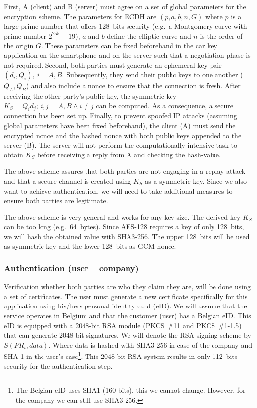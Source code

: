First, A (client) and B (server) must agree on a set of global parameters for the encryption scheme. The parameters for ECDH are $(p, a, b, n, G)$ where $p$ is a large prime number that offers 128~bits security (e.g.\ a Montgomery curve with prime number $2^{255}-19$), $a$ and $b$ define the elliptic curve and $n$ is the order of the origin $G$. These parameters can be fixed beforehand in the car key application on the smartphone and on the server such that a negotiation phase is not required. Second, both parties must generate an ephemeral key pair $(d_i,Q_i),\ i=A,B$. Subsequently, they send their public keys to one another ($Q_A, Q_B$) and also include a nonce to ensure that the connection is fresh. After receiving the other party's public key, the symmetric key $K_S=Q_id_j;\ i,j=A,B \land i\ne j$ can be computed. As a consequence, a secure connection has been set up. Finally, to prevent spoofed IP attacks (assuming global parameters have been fixed beforehand), the client (A) must send the encrypted nonce and the hashed nonce with both public keys appended to the server (B). The server will not perform the computationally intensive task to obtain $K_S$ before receiving a reply from A and checking the hash-value.

The above scheme assures that both parties are not engaging in a replay attack and that a secure channel is created using $K_S$ as a symmetric key. Since we also want to achieve authentication, we will need to take additional measures to ensure both parties are legitimate.

The above scheme is very general and works for any key size. The derived key $K_S$ can be too long (e.g.\ 64~bytes). Since AES-128 requires a key of only 128~bits, we will hash the obtained value with SHA3-256. The upper 128~bits will be used as symmetric key and the lower 128~bits as GCM nonce.

\subsubsection{Authentication (user -- company)}

Verification whether both parties are who they claim they are, will be done using a set of certificates. The user must generate a new certificate specifically for this application using his/hers personal identity card (eID). We will assume that the service operates in Belgium and that the customer (user) has a Belgian eID. This eID is equipped with a 2048-bit RSA module (PKCS~\#11 and PKCS~\#1-1.5) that can generate 2048-bit signatures. We will denote the RSA-signing scheme by $S(PR_i,data)$. Where data is hashed with SHA3-256 in case of the company and SHA-1 in the user's case\footnote{The Belgian eID uses SHA1 (160 bits), this we cannot change. However, for the company we can still use SHA3-256.}. This 2048-bit RSA system results in only 112~bits security for the authentication step.


